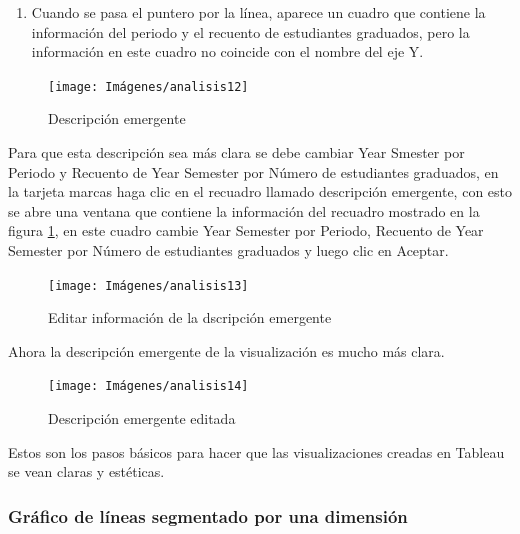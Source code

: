 \documentclass[
]{book}
\providecommand{\tightlist}{%
  \setlength{\itemsep}{0pt}\setlength{\parskip}{0pt}}
\begin{document}
\begin{enumerate}
\def\labelenumi{\arabic{enumi}.}
\setcounter{enumi}{7}
\tightlist
\item
  Cuando se pasa el puntero por la línea, aparece un cuadro que contiene la información del periodo y el recuento de estudiantes graduados, pero la información en este cuadro no coincide con el nombre del eje Y.
\end{enumerate}

\begin{figure}

{\centering \texttt{[image: Imágenes/analisis12]} 

}

\caption{Descripción emergente}\label{fig:paso8-1lineas-fig}
\end{figure}

Para que esta descripción sea más clara se debe cambiar Year Smester por Periodo y Recuento de Year Semester por Número de estudiantes graduados, en la tarjeta marcas haga clic en el recuadro llamado descripción emergente, con esto se abre una ventana que contiene la información del recuadro mostrado en la figura \ref{fig:paso8-1lineas-fig}, en este cuadro cambie Year Semester por Periodo, Recuento de Year Semester por Número de estudiantes graduados y luego clic en Aceptar.

\begin{figure}

{\centering \texttt{[image: Imágenes/analisis13]} 

}

\caption{Editar información de la dscripción emergente}\label{fig:paso8-2lineas-fig}
\end{figure}

Ahora la descripción emergente de la visualización es mucho más clara.

\begin{figure}

{\centering \texttt{[image: Imágenes/analisis14]} 

}

\caption{Descripción emergente editada}\label{fig:paso8-3lineas-fig}
\end{figure}

Estos son los pasos básicos para hacer que las visualizaciones creadas en Tableau se vean claras y estéticas.

\hypertarget{graficodelineassegmentado}{%
\subsubsection{Gráfico de líneas segmentado por una dimensión}\label{graficodelineassegmentado}}
\end{document}
